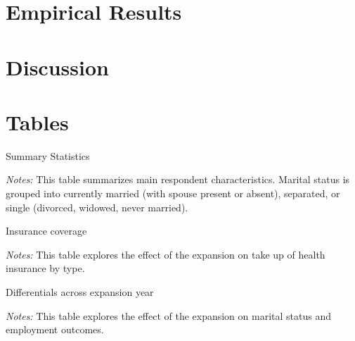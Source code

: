 \documentclass{article}
\begin{document}
\section{Empirical Results}


\section{Discussion}


\newpage


\newpage
\section{Tables}

\newpage
\begin{table}[h!]
\begin{centering}
\singlespacing
\caption{Summary Statistics}
\label{tab:sumstat}
\end{centering}
\begin{spacing}{1}
\begin{footnotesize}

\textit{Notes:} This table summarizes main respondent characteristics. Marital status is grouped into currently married (with spouse present or absent), separated, or single (divorced, widowed, never married). 
\end{footnotesize}
\end{spacing}
\end{table}

\newpage
\begin{table}[h!]
\begin{centering}
\singlespacing
\caption{Insurance coverage}
\label{tab:cov}
\end{centering}
\begin{spacing}{1}
\begin{footnotesize}

\textit{Notes:} This table explores the effect of the expansion on take up of health insurance by type.
\end{footnotesize}
\end{spacing}
\end{table}

\newpage
\begin{table}[h!]
\begin{centering}
\singlespacing
\caption{Differentials across expansion year}
\label{tab:expdiff}
\end{centering}
\begin{spacing}{1}
\begin{footnotesize}

\textit{Notes:} This table explores the effect of the expansion on marital status and employment outcomes.
\end{footnotesize}
\end{spacing}
\end{table}
\end{document}
